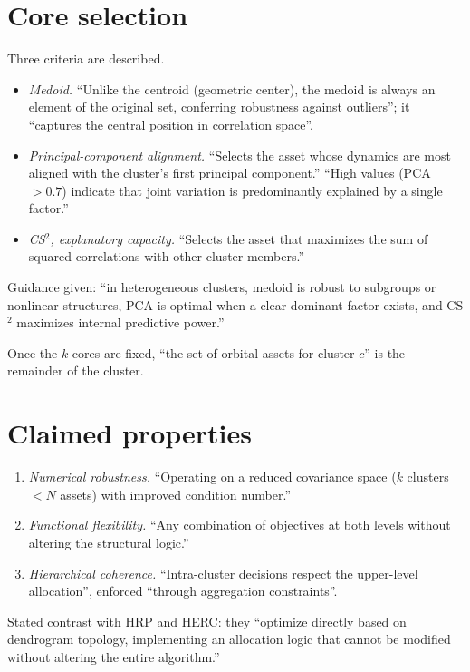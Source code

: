 \documentclass[11pt]{article}
\begin{document}
\section*{Core selection}

Three criteria are described.

\begin{itemize}
\item \emph{Medoid.} ``Unlike the centroid (geometric center), the medoid is
  always an element of the original set, conferring robustness against
  outliers''; it ``captures the central position in correlation space''.
\item \emph{Principal-component alignment.} ``Selects the asset whose
  dynamics are most aligned with the cluster's first principal component.''
  ``High values (PCA $> 0.7$) indicate that joint variation is predominantly
  explained by a single factor.''
\item \emph{CS$^2$, explanatory capacity.} ``Selects the asset that maximizes
  the sum of squared correlations with other cluster members.''
\end{itemize}

Guidance given: ``in heterogeneous clusters, medoid is robust to subgroups
or nonlinear structures, PCA is optimal when a clear dominant factor
exists, and CS$^2$ maximizes internal predictive power.''

Once the $k$ cores are fixed, ``the set of orbital assets for cluster $c$''
is the remainder of the cluster.

\section*{Claimed properties}

\begin{enumerate}
\item \emph{Numerical robustness.} ``Operating on a reduced covariance space
  ($k$ clusters $< N$ assets) with improved condition number.''
\item \emph{Functional flexibility.} ``Any combination of objectives at both
  levels without altering the structural logic.''
\item \emph{Hierarchical coherence.} ``Intra-cluster decisions respect the
  upper-level allocation'', enforced ``through aggregation constraints''.
\end{enumerate}

Stated contrast with HRP and HERC: they ``optimize directly based on
dendrogram topology, implementing an allocation logic that cannot be
modified without altering the entire algorithm.''
\end{document}
